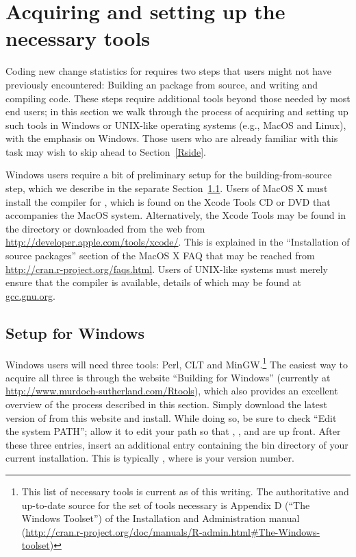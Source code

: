 \documentclass[nojss]{jss}
\begin{document}
\section{Acquiring and setting up the necessary tools}
\label{Tools}

Coding new change statistics for  requires two steps that users might
not have previously encountered: Building an  package from source,
and writing and compiling  code. These steps require additional
tools beyond those needed by most  end users; in this section we
walk through the process of acquiring and setting up such tools in Windows or
UNIX-like operating systems (e.g., MacOS and Linux), with the emphasis on
Windows. 
Those users who are already familiar with this task may wish to skip ahead to
Section~\ref{Rside}.

Windows users require a bit of preliminary setup for the building-from-source
step, which we describe in the separate Section~\ref{AcqTools}.  Users of MacOS X
must install the 
compiler for , which is found on the Xcode Tools CD or
DVD that accompanies the MacOS system.  Alternatively, the Xcode Tools may
be found in the  directory or downloaded from the
web from \url{http://developer.apple.com/tools/xcode/}.  This is explained in the 
``Installation of source packages'' section of the
 MacOS X FAQ that may be reached from
\url{http://cran.r-project.org/faqs.html}.  Users of UNIX-like systems must merely
ensure that the  compiler is available, details of which may be
found at \url{gcc.gnu.org}.

\subsection{Setup for Windows}
\label{AcqTools}

Windows users will need three tools: Perl, CLT and MinGW.\footnote{This list of
necessary tools is current as of this writing. The authoritative and up-to-date
source for the set of tools necessary is Appendix D (``The Windows Toolset'') of
the  Installation and Administration manual
(\url{http://cran.r-project.org/doc/manuals/R-admin.html\#The-Windows-toolset})}
The easiest way to acquire all three is through the website ``Building
 for Windows'' (currently at
\url{http://www.murdoch-sutherland.com/Rtools}), which also provides an
excellent overview of the process described in this section. Simply download the
latest version of  from this website and install.  While 
doing so, be sure to check ``Edit the system PATH''; allow it to edit your path
so that , , and  are up front. After these three
entries, insert an additional entry containing the bin directory of your current
 installation. This is typically , where  is
your  version number.
\end{document}
